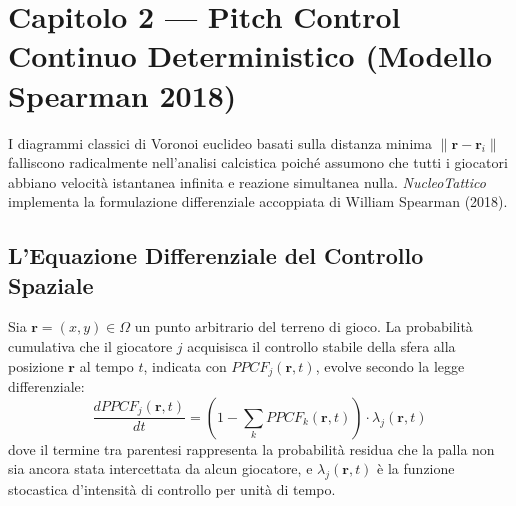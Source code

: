 \documentclass[11pt,a4paper]{article}
\begin{document}
\section{Capitolo 2 — Pitch Control Continuo Deterministico (Modello Spearman 2018)}

I diagrammi classici di Voronoi euclideo basati sulla distanza minima $\|\mathbf{r} - \mathbf{r}_i\|$ falliscono radicalmente nell'analisi calcistica poiché assumono che tutti i giocatori abbiano velocità istantanea infinita e reazione simultanea nulla. \textsl{NucleoTattico} implementa la formulazione differenziale accoppiata di William Spearman (2018).

\subsection{L'Equazione Differenziale del Controllo Spaziale}
Sia $\mathbf{r} = (x, y) \in \Omega$ un punto arbitrario del terreno di gioco. La probabilità cumulativa che il giocatore $j$ acquisisca il controllo stabile della sfera alla posizione $\mathbf{r}$ al tempo $t$, indicata con $PPCF_j(\mathbf{r}, t)$, evolve secondo la legge differenziale:
\begin{equation}
\frac{d PPCF_j(\mathbf{r}, t)}{dt} = \left( 1 - \sum_{k} PPCF_k(\mathbf{r}, t) \right) \cdot \lambda_j(\mathbf{r}, t)
\end{equation}
dove il termine tra parentesi rappresenta la probabilità residua che la palla non sia ancora stata intercettata da alcun giocatore, e $\lambda_j(\mathbf{r}, t)$ è la funzione stocastica d'intensità di controllo per unità di tempo.
\end{document}
